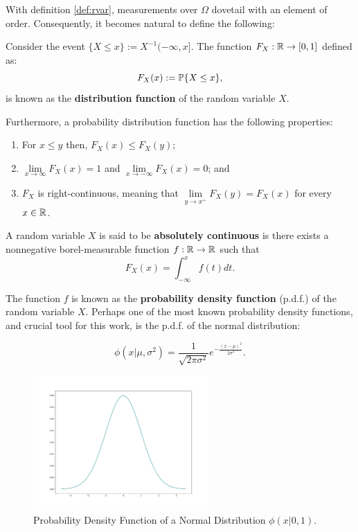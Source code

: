 \documentclass[../TGMAFFIRO.tex]{subfiles}
\begin{document}
With definition \ref{def:rvar}, measurements over $\Omega$ dovetail with an element of order. Consequently, it becomes natural to define the following:

\begin{definition}\label{dist_func}
	Consider the event $\{X \leq x\} := X^{-1}(-\infty, x]$. The function $F_X: \mathbb{R} \rightarrow [0, 1]$ defined as:
	\begin{equation}
		F_X(x) := \mathbb{P}\{X \leq x\},
	\end{equation}
	is known as the \textbf{distribution function} of the random variable $X$.
\end{definition}

Furthermore, a probability distribution function has the following properties:
\begin{enumerate}
	\item For $x \leq y$ then, $F_X(x) \leq F_X(y)$;
	\item $\lim\limits_{x\to\infty} F_X(x) = 1$ and $\lim\limits_{x\to - \infty} F_X(x) = 0$; and
	\item $F_X$ is right-continuous, meaning that $\lim\limits_{y\to x^+} F_X(y) = F_X(x)$ for every $x \in \mathbb{R}$.
\end{enumerate}

\begin{definition}
	A random variable $X$ is said to be \textbf{absolutely continuous} is there exists a nonnegative borel-measurable function $f: \mathbb{R}\rightarrow\mathbb{R}$ such that 
	\begin{equation}
		F_X(x) = \int_{-\infty}^{x} f(t) dt.
	\end{equation}
\end{definition}


The function $f$ is known as the \textbf{probability density function} (p.d.f.) of the random variable $X$. Perhaps one of the most known probability density functions, and crucial tool for this work, is the p.d.f. of the normal distribution:

\begin{equation}\label{eq:normal_distribution}
	\phi(x|\mu, \sigma^2) = \frac{1}{\sqrt{2\pi\sigma^2}}e^{-\frac{(x - \mu)^2}{2\sigma^2}}.
\end{equation}

\begin{figure}[h]
	\centering
	\includegraphics[width=0.6\textwidth]{images/normal_distribution}
	\caption{Probability Density Function of a Normal Distribution $\phi(x|0,1)$.}
	\label{fig:normal_distribution}
\end{figure}
\end{document}
